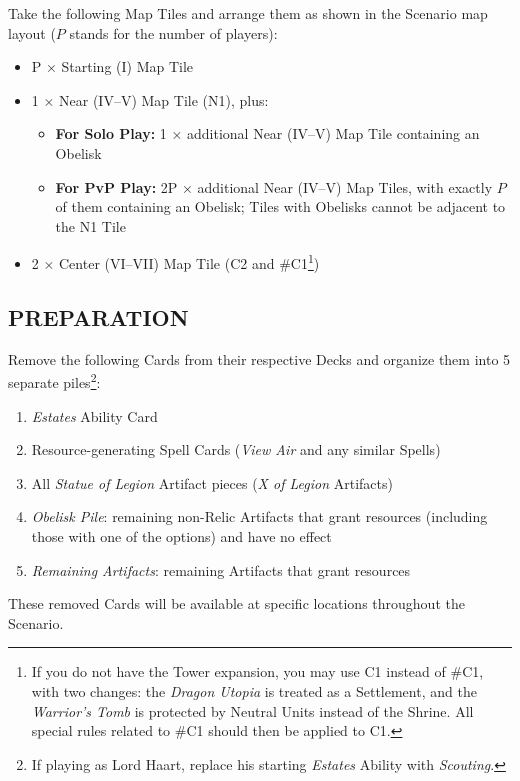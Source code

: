 \begin{multicols}{2}
Take the following Map Tiles and arrange them as shown in the Scenario map layout ($P$ stands for the number of players):
\begin{itemize}
  \item P × Starting (I) Map Tile
  \item 1 × Near (IV--V) Map Tile (N1), plus:
  \begin{itemize}
    \item \textbf{For Solo Play:} 1 × additional Near (IV--V) Map Tile containing an Obelisk
    \item \textbf{For PvP Play:} 2P × additional Near (IV--V) Map Tiles, with exactly $P$ of them containing an Obelisk; Tiles with Obelisks cannot be adjacent to the N1 Tile
  \end{itemize}
  \item 2 × Center (VI--VII) Map Tile (C2 and \#C1\footnote{If you do not have the Tower expansion, you may use C1 instead of \#C1, with two changes: the \textit{Dragon Utopia} is treated as a Settlement, and the \textit{Warrior's Tomb} is protected by Neutral Units instead of the Shrine. All special rules related to \#C1 should then be applied to C1.})
\end{itemize}
\subsection*{\MakeUppercase{Preparation}}

Remove the following Cards from their respective Decks and organize them into 5 separate piles\footnote{If playing as Lord Haart, replace his starting \textit{Estates} Ability with \textit{Scouting}.}:
  
\begin{enumerate}
  \item \textit{Estates} Ability Card
  \item Resource-generating Spell Cards (\textit{View Air} and any similar Spells)
  \item All \textit{Statue of Legion} Artifact pieces (\textit{X of Legion} Artifacts)
  \item \textit{Obelisk Pile}: remaining non-Relic Artifacts that grant resources (including those with one of the options) and have no  effect
  \item \textit{Remaining Artifacts}: remaining Artifacts that grant resources 
\end{enumerate}
  
These removed Cards will be available at specific locations throughout the Scenario.


\end{multicols}
